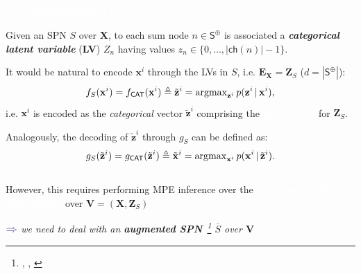 \documentclass[xcolor={usenames,dvipsnames,svgnames}, compress]{beamer}
\newcommand{\argmax}{\operatornamewithlimits{argmax}}
\newcommand{\nodeset}[1]{\bm{\mathsf{#1}}}
\newcommand{\cbar}{\,|\,}
\newcommand{\highlighttext}[2][yellow]{{\colorbox{#1}{\textcolor{white}{#2}}}}
\newcommand{\customcite}[1]{\footnote{\tiny \citeauthor{#1}, \citetitle{#1}, \citeyear{#1}}}
\begin{document}
   

\begin{frame}[t]
    \frametitle{\highlighttext[bgrey1]{$\mathsf{CAT}$ embeddings (I)}}
    \footnotesize

    Given an SPN $S$ over $\mathbf{X}$,  to each sum node
    $n\in\nodeset{S}^{\oplus}$ is associated a \emph{\textbf{categorical latent
    variable}} (\textbf{LV}) $Z_{n}$
    having values $z_{n}\in\{0,\dots,|\mathsf{ch}(n)|-1\}$.\par\bigskip

    It would be natural to encode $\mathbf{x}^{i}$ through
    the  LVs in $S$,
    i.e. $\mathbf{E}_{\mathbf{X}}=\mathbf{Z}_{S}$ ($d=|\nodeset{S}^{\oplus}|$):
%
\begin{equation}
  \label{eq:lv-enc}
  f_{S}(\mathbf{x}^{i}) 
  = f_{\mathsf{CAT}}(\mathbf{x}^{i}) \triangleq \tilde{\mathbf{z}}^{i} = \argmax\nolimits_{\mathbf{z}^i}p(\mathbf{z}^i \cbar \mathbf{x}^{i}),
\end{equation}
i.e. $\mathbf{x}^{i}$ is encoded as the \emph{categorical} vector
$\tilde{\mathbf{z}}^{i}$ %
comprising the \highlighttext[tomato0]{\emph{\textbf{MPE state}}} for $\mathbf{Z}_{S}$.\par\bigskip
%
Analogously, the decoding of $\tilde{\mathbf{z}}^{i}$
 through $g_{S}$ can be defined as:
\begin{equation}
  \label{eq:lv-dec}
  g_{S}(\tilde{\mathbf{z}}^{i}) 
  = g_{\mathsf{CAT}}(\tilde{\mathbf{z}}^{i}) \triangleq \tilde{\mathbf{x}}^{i} = \argmax\nolimits_{\mathbf{x}^i} p(\mathbf{x}^i \cbar \tilde{\mathbf{z}}^{i}).
\end{equation}\\[10pt]

However, this requires performing MPE inference over the \highlighttext[tomato0]{\emph{\textbf{joint
probability distribution}}} over $\mathbf{V}=(\mathbf{X}, \mathbf{Z}_{S})$

\begin{minipage}{1.0\linewidth}
      \raggedleft
      $\color{violet}\boldsymbol\Rightarrow$
      \scriptsize
     \emph{we need to deal with an \emph{\textbf{augmented
           SPN}}~\customcite{Peharz2016} $\overline{S}$ over $\mathbf{V}$}
\end{minipage}
    

\end{frame}
\end{document}

